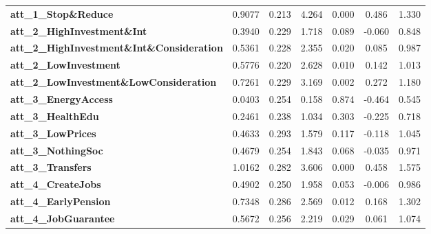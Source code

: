 \begin{center}
\begin{tabular}{lcccccc}
\textbf{att\_1\_Stop\&Reduce}                       &       0.9077  &        0.213     &     4.264  &         0.000        &        0.486    &        1.330     \\
\textbf{att\_2\_HighInvestment\&Int}                &       0.3940  &        0.229     &     1.718  &         0.089        &       -0.060    &        0.848     \\
\textbf{att\_2\_HighInvestment\&Int\&Consideration} &       0.5361  &        0.228     &     2.355  &         0.020        &        0.085    &        0.987     \\
\textbf{att\_2\_LowInvestment}                      &       0.5776  &        0.220     &     2.628  &         0.010        &        0.142    &        1.013     \\
\textbf{att\_2\_LowInvestment\&LowConsideration}    &       0.7261  &        0.229     &     3.169  &         0.002        &        0.272    &        1.180     \\
\textbf{att\_3\_EnergyAccess}                       &       0.0403  &        0.254     &     0.158  &         0.874        &       -0.464    &        0.545     \\
\textbf{att\_3\_HealthEdu}                          &       0.2461  &        0.238     &     1.034  &         0.303        &       -0.225    &        0.718     \\
\textbf{att\_3\_LowPrices}                          &       0.4633  &        0.293     &     1.579  &         0.117        &       -0.118    &        1.045     \\
\textbf{att\_3\_NothingSoc}                         &       0.4679  &        0.254     &     1.843  &         0.068        &       -0.035    &        0.971     \\
\textbf{att\_3\_Transfers}                          &       1.0162  &        0.282     &     3.606  &         0.000        &        0.458    &        1.575     \\
\textbf{att\_4\_CreateJobs}                         &       0.4902  &        0.250     &     1.958  &         0.053        &       -0.006    &        0.986     \\
\textbf{att\_4\_EarlyPension}                       &       0.7348  &        0.286     &     2.569  &         0.012        &        0.168    &        1.302     \\
\textbf{att\_4\_JobGuarantee}                       &       0.5672  &        0.256     &     2.219  &         0.029        &        0.061    &        1.074     \\

\end{tabular}
\end{center}
